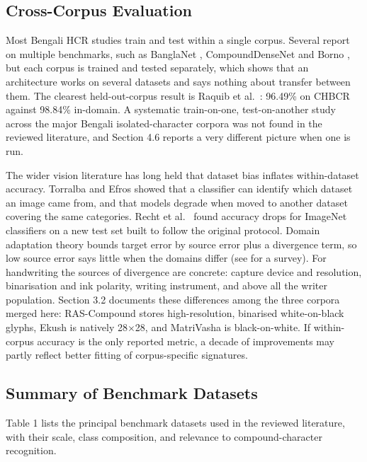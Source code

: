 \subsection{Cross-Corpus Evaluation}\label{cross-corpus-literature}

Most Bengali HCR studies train and test within a single corpus. Several report on multiple benchmarks, such as BanglaNet \citep{ref35}, CompoundDenseNet \citep{ref23} and Borno \citep{ref15}, but each corpus is trained and tested separately, which shows that an architecture works on several datasets and says nothing about transfer between them. The clearest held-out-corpus result is Raquib et al.~\citeyearpar{ref25}: 96.49\% on CHBCR against 98.84\% in-domain. A systematic train-on-one, test-on-another study across the major Bengali isolated-character corpora was not found in the reviewed literature, and Section 4.6 reports a very different picture when one is run.

The wider vision literature has long held that dataset bias inflates within-dataset accuracy. Torralba and Efros \citeyearpar{ref45} showed that a classifier can identify which dataset an image came from, and that models degrade when moved to another dataset covering the same categories. Recht et al.~\citeyearpar{ref46} found accuracy drops for ImageNet classifiers on a new test set built to follow the original protocol. Domain adaptation theory \citep{ref47} bounds target error by source error plus a divergence term, so low source error says little when the domains differ (see \citep{ref57} for a survey). For handwriting the sources of divergence are concrete: capture device and resolution, binarisation and ink polarity, writing instrument, and above all the writer population. Section 3.2 documents these differences among the three corpora merged here: RAS-Compound stores high-resolution, binarised white-on-black glyphs, Ekush is natively 28$\times$28, and MatriVasha is black-on-white. If within-corpus accuracy is the only reported metric, a decade of improvements may partly reflect better fitting of corpus-specific signatures.

\hypertarget{summary-of-benchmark-datasets}{%
\subsection{Summary of Benchmark
Datasets}\label{summary-of-benchmark-datasets}}

Table 1 lists the principal benchmark datasets used in the reviewed literature, with their scale, class composition, and relevance to compound-character recognition.


